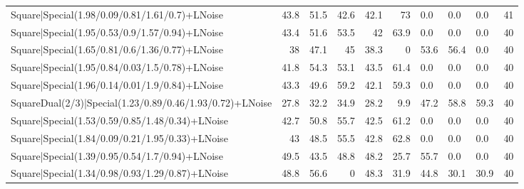\begin{tabular}{lrrrrrlllr}
 Square|Special(1.98/0.09/0.81/1.61/0.7)+LNoise                  &            43.8 &            51.5 &            42.6 &            42.1 &           73   & 0.0             & 0.0            & 0.0            &           41 \\
 Square|Special(1.95/0.53/0.9/1.57/0.94)+LNoise                  &            43.4 &            51.6 &            53.5 &            42   &           63.9 & 0.0             & 0.0            & 0.0            &           40 \\
 Square|Special(1.65/0.81/0.6/1.36/0.77)+LNoise                  &            38   &            47.1 &            45   &            38.3 &            0   & 53.6            & 56.4           & 0.0            &           40 \\
 Square|Special(1.95/0.84/0.03/1.5/0.78)+LNoise                  &            41.8 &            54.3 &            53.1 &            43.5 &           61.4 & 0.0             & 0.0            & 0.0            &           40 \\
 Square|Special(1.96/0.14/0.01/1.9/0.84)+LNoise                  &            43.3 &            49.6 &            59.2 &            42.1 &           59.3 & 0.0             & 0.0            & 0.0            &           40 \\
 SquareDual(2/3)|Special(1.23/0.89/0.46/1.93/0.72)+LNoise        &            27.8 &            32.2 &            34.9 &            28.2 &            9.9 & 47.2            & 58.8           & 59.3           &           40 \\
 Square|Special(1.53/0.59/0.85/1.48/0.34)+LNoise                 &            42.7 &            50.8 &            55.7 &            42.5 &           61.2 & 0.0             & 0.0            & 0.0            &           40 \\
 Square|Special(1.84/0.09/0.21/1.95/0.33)+LNoise                 &            43   &            48.5 &            55.5 &            42.8 &           62.8 & 0.0             & 0.0            & 0.0            &           40 \\
 Square|Special(1.39/0.95/0.54/1.7/0.94)+LNoise                  &            49.5 &            43.5 &            48.8 &            48.2 &           25.7 & 55.7            & 0.0            & 0.0            &           40 \\
 Square|Special(1.34/0.98/0.93/1.29/0.87)+LNoise                 &            48.8 &            56.6 &             0   &            48.3 &           31.9 & 44.8            & 30.1           & 30.9           &           40 \\

\end{tabular}
